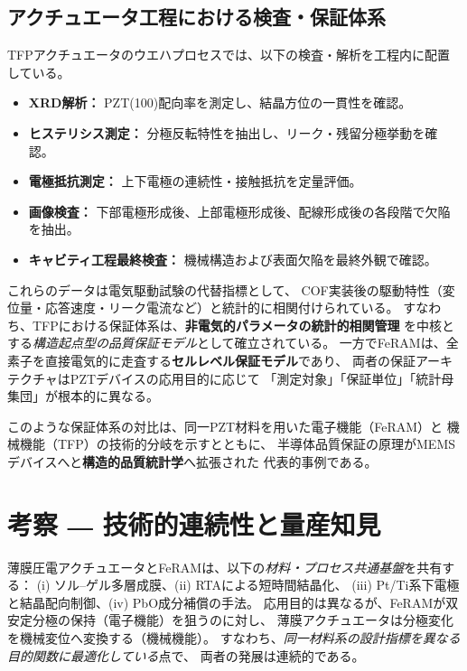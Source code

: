 \documentclass[conference]{IEEEtran}
\begin{document}
\subsection{アクチュエータ工程における検査・保証体系}
TFPアクチュエータのウエハプロセスでは、以下の検査・解析を工程内に配置している。
\begin{itemize}
  \item \textbf{XRD解析：} PZT(100)配向率を測定し、結晶方位の一貫性を確認。
  \item \textbf{ヒステリシス測定：} 分極反転特性を抽出し、リーク・残留分極挙動を確認。
  \item \textbf{電極抵抗測定：} 上下電極の連続性・接触抵抗を定量評価。
  \item \textbf{画像検査：} 下部電極形成後、上部電極形成後、配線形成後の各段階で欠陥を抽出。
  \item \textbf{キャビティ工程最終検査：} 機械構造および表面欠陥を最終外観で確認。
\end{itemize}

これらのデータは電気駆動試験の代替指標として、
COF実装後の駆動特性（変位量・応答速度・リーク電流など）と統計的に相関付けられている。
すなわち、TFPにおける保証体系は、\textbf{非電気的パラメータの統計的相関管理}
を中核とする\emph{構造起点型の品質保証モデル}として確立されている。
一方でFeRAMは、全素子を直接電気的に走査する\textbf{セルレベル保証モデル}であり、
両者の保証アーキテクチャはPZTデバイスの応用目的に応じて
「測定対象」「保証単位」「統計母集団」が根本的に異なる。

\medskip
このような保証体系の対比は、同一PZT材料を用いた電子機能（FeRAM）と
機械機能（TFP）の技術的分岐を示すとともに、
半導体品質保証の原理がMEMSデバイスへと\textbf{構造的品質統計学}へ拡張された
代表的事例である。

\section{考察 ― 技術的連続性と量産知見}
薄膜圧電アクチュエータとFeRAMは、以下の\emph{材料・プロセス共通基盤}を共有する：
(i) ソル–ゲル多層成膜、(ii) RTAによる短時間結晶化、
(iii) Pt/Ti系下電極と結晶配向制御、(iv) PbO成分補償の手法\cite{bottaro1993solgel,scott2000review,damjanovic2010ferro}。
応用目的は異なるが、FeRAMが双安定分極の保持（電子機能）を狙うのに対し、
薄膜アクチュエータは分極変化を機械変位へ変換する（機械機能）。
すなわち、\emph{同一材料系の設計指標を異なる目的関数に最適化している}点で、
両者の発展は連続的である。
\end{document}
